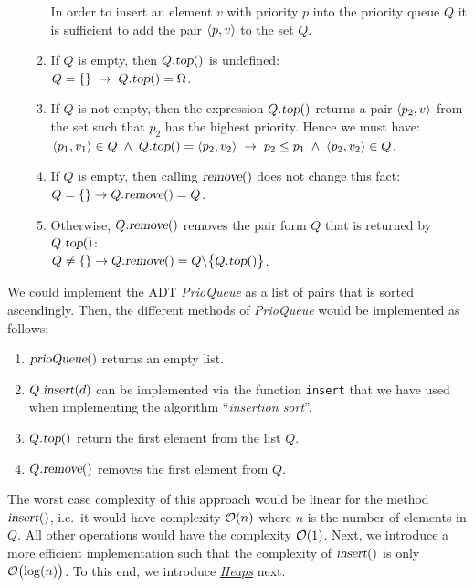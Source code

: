 \begin{Definition}
\begin{enumerate}
\begin{enumerate}
            In order to insert an  element $v$ with priority $p$ into the priority queue 
            $Q$ it is sufficient to add the pair $\pair(p,v)$ to the set $Q$.
      \item If  $Q$ is empty, then $Q.\textsl{top}()$ is undefined: \\[0.1cm]
            \hspace*{1.3cm} $Q = \{\} \;\rightarrow\; Q.\textsl{top}() = \Omega$.
     \item If $Q$ is not empty, then the expression $Q.\textsl{top}()$ returns a pair $\pair(p_2,v)$
           from the set such that $p_2$ has the highest priority.  Hence we must have:
              \\[0.1cm]
              \hspace*{1.3cm} 
              $\pair(p_1,v_1) \in Q \;\wedge\; Q.\textsl{top}() = \pair(p_2,v_2)
              \;\rightarrow\; p_2 \leq p_1 \;\wedge\; \pair(p_2,v_2) \in Q$.
      \item If  $Q$ is empty, then calling $\textsl{remove}()$ does not change this fact: \\[0.1cm]
            \hspace*{1.3cm} $Q = \{\} \rightarrow Q.\textsl{remove}() = Q$.
      \item Otherwise,  $Q.\textsl{remove}()$ removes the pair form $Q$ that is returned by $Q.\textsl{top}()$: \\[0.1cm]
            \hspace*{1.3cm} 
            $Q \not= \{\} \rightarrow Q.\textsl{remove}() = Q \backslash \bigl\{ Q.\textsl{top}() \bigr\}$.
      \end{enumerate}
\end{enumerate}
\end{Definition}
We could implement the ADT \textsl{PrioQueue} as a list of pairs that is sorted ascendingly.
Then, the different methods of \textsl{PrioQueue} would be implemented as follows:
\begin{enumerate}
\item $\textsl{prioQueue}()$ returns an empty list.
\item $Q.\textsl{insert}(d)$ can be implemented via the function  \texttt{insert} that we have
      used when implementing the algorithm ``\emph{insertion sort}''.
\item $Q.\textsl{top}()$ return the first element from the list $Q$.
\item $Q.\textsl{remove}()$ removes the first element from $Q$.
\end{enumerate}
The worst case complexity of this approach would be linear for the method $\textsl{insert}()$,
i.e.~it would have complexity $\mathcal{O}(n)$ where $n$ is the number of elements in $Q$. 
All other operations would have the complexity $\mathcal{O}(1)$.  
Next, we introduce a more efficient implementation such that the complexity of $\textsl{insert}()$ 
is only $\mathcal{O}\bigl(\log(n)\bigr)$.  To this end, we introduce
\href{https://en.wikipedia.org/wiki/Heap_(data_structure)}{\emph{Heaps}} next. 


